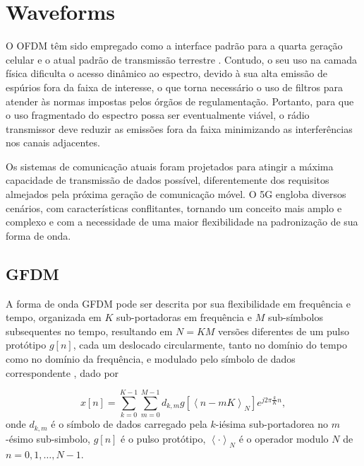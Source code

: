 \section{Waveforms} \label{sec:wave}

O OFDM têm sido empregado como a interface padrão para a quarta geração celular e o atual padrão de transmissão terrestre \cite{ref_OFDM}. Contudo, o seu uso na camada física dificulta o acesso dinâmico ao espectro, devido à sua alta emissão de espúrios fora da faixa de interesse, o que torna necessário o uso de filtros para atender às normas impostas pelos órgãos de regulamentação. Portanto, para que o uso fragmentado do espectro possa ser eventualmente viável, o rádio transmissor deve reduzir as emissões fora da faixa minimizando as interferências nos canais adjacentes.\par
Os sistemas de comunicação atuais foram projetados para atingir a máxima capacidade de transmissão de dados possível, diferentemente dos requisitos almejados pela próxima geração de comunicação móvel. O 5G engloba diversos cenários, com características conflitantes, tornando um conceito mais amplo e complexo \cite{ref_pekka} e com a necessidade de uma maior flexibilidade na padronização de sua forma de onda. \par

\subsection{GFDM}

A forma de onda GFDM pode ser descrita por sua flexibilidade em frequência e tempo, organizada em  $K$ sub-portadoras em frequência e $M$ sub-símbolos subsequentes no tempo, resultando em $N = KM$ versões diferentes de um pulso protótipo $g [n]$, cada um deslocado circularmente, tanto no domínio do tempo como no domínio da frequência, e modulado pelo símbolo de dados correspondente \cite{gfdm}, dado por \par

\begin{equation}\label{eq:xn}
x[n] = \sum_{k=0}^{K-1}\sum_{m=0}^{M-1}d_{k,m}g\left[\left<n-mK\right>_N\right]{e}^{j2\pi\frac{k}{K}n},
\end{equation}
\nonident onde $d_{k,m}$ é o símbolo de dados carregado pela $k$-iésima sub-portadorea no $m$-ésimo sub-simbolo, $g[n]$ é o pulso protótipo, $\left<\cdot\right>_N$ é o operador modulo $N$ de $n=0,1,\ldots,N-1$. \par

